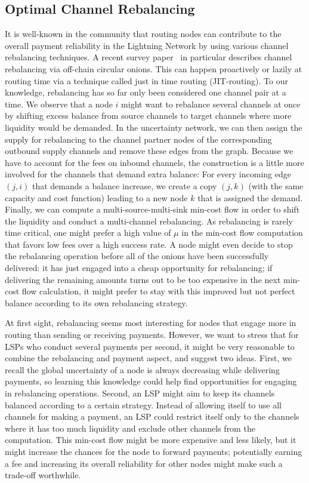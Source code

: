 \documentclass[10pt,twocolumn]{article}
\begin{document}
\subsection{Optimal Channel Rebalancing}
\label{rebalancing}
It is well-known in the community that routing nodes can contribute to the overall payment reliability in the Lightning Network by using various channel rebalancing techniques. A recent survey paper~\cite{papadis2020blockchain} in particular describes channel rebalancing via off-chain circular onions. This can happen proactively or lazily at routing time via a technique called just in time routing (JIT-routing)\cite{Pickhardt2019}. To our knowledge, rebalancing has so far only been considered one channel pair at a time.
We observe that a node $i$ might want to rebalance several channels at once by shifting excess balance from source channels to target channels where more liquidity would be demanded.
In the uncertainty network, we can then assign the supply for rebalancing to the channel partner nodes of the corresponding outbound supply channels and remove these edges from the graph.
Because we have to account for the fees on inbound channels, the construction is a little more involved for the channels that demand extra balance: For every incoming edge $(j,i)$ that demands a balance increase, we create a copy $(j,k)$
(with the same capacity and cost function) leading to a new node $k$ that is assigned the demand.
Finally, we can compute a multi-source-multi-sink min-cost flow in order to shift the liquidity and conduct a multi-channel rebalancing.
As rebalancing is rarely time critical, one might prefer a high value of $\mu$ in the min-cost flow computation that favors low fees over a high success rate.
A node might even decide to stop the rebalancing operation before all of the onions have been successfully delivered: it has just engaged into a cheap opportunity for rebalancing; if delivering the remaining amounts turns out to be too expensive in the next min-cost flow calculation, it might prefer to stay with this improved but not perfect balance according to its own rebalancing strategy.

At first sight, rebalancing seems most interesting for nodes that engage more in routing than sending or receiving payments.
However, we want to stress that for LSPs who conduct several payments per second, it might be very reasonable to combine the rebalancing and payment aspect, and suggest two ideas.
First, we recall the global uncertainty of a node is always decreasing while delivering payments, so learning this knowledge could help find opportunities for engaging in rebalancing operations.
Second, an LSP might aim to keep its channels balanced according to a certain strategy.
Instead of allowing itself to use all channels for making a payment, an LSP could restrict itself only to the channels where it has too much liquidity and exclude other channels from the computation.
This min-cost flow might be more expensive and less likely, but it might increase the chances for the node to forward payments; potentially earning a fee and increasing its overall reliability for other nodes might make such a trade-off worthwhile.
\end{document}
